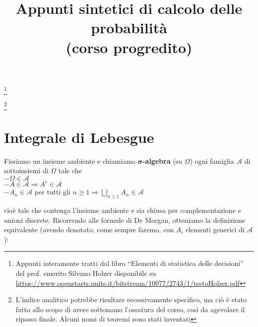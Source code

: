 \documentclass[a4paper,11pt]{article}
\theoremstyle{plain}
\theoremstyle{definition}
\theoremstyle{remark}
\begin{document}
\title{Appunti sintetici di calcolo delle probabilità \\(corso progredito)}
\maketitle
\footnote{Appunti interamente tratti dal libro “Elementi di statistica delle decisioni” del prof. emerito Silvano Holzer disponibile su \url{https://www.openstarts.units.it/bitstream/10077/2743/1/testoHolzer.pdf}{} }

\footnote{L'indice analitico potrebbe risultare eccessivamente specifico, ma ciò è stato fatto allo scopo di avere sottomano l'ossatura  del corso, così da agevolare il ripasso finale. Alcuni nomi di teoremi sono stati inventati}



\newpage

\tableofcontents
\newpage
\section{Integrale di Lebesgue}
Fissiamo un insieme ambiente e chiamiamo $\boldsymbol{\sigma}$\textbf{-algebra} (su $\Omega$) ogni famiglia $\mathcal{A}$ di sottoinsiemi di $\Omega$ tale che\\
$-\Omega\in \mathcal{A}$\\
$-A\in \mathcal{A}\Rightarrow A^{c}\in \mathcal{A}$\\
$-A_{n}\in \mathcal{A}$ per tutti gli $n\displaystyle \geq 1\Rightarrow\bigcup_{n\geq 1}A_{n}\in \mathcal{A}$

cio\`{e} tale che contenga l'insieme ambiente e sia chiusa per complementazione e unioni discrete. Ricorrendo alle formule di De Morgan, otteniamo la definizione equivalente (avendo denotato, come sempre faremo, con $A_{i}$ elementi generici di $\mathcal{A}$):
\end{document}
